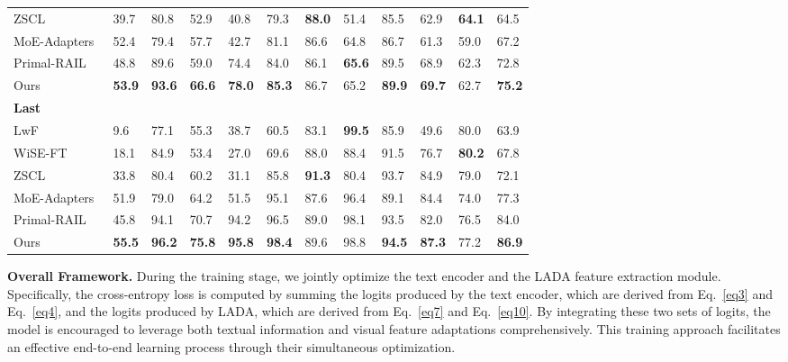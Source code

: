 \documentclass{article}
\theoremstyle{plain}
\theoremstyle{definition}
\theoremstyle{remark}
\begin{document}
\begin{table}[tbhp]
\begin{tabular}{b{15em}b{1.6em}b{1.6em}b{1.6em}b{1.6em}b{1.6em}b{1.6em}b{1.6em}b{1.6em}b{1.6em}b{1.6em}>{\centering\arraybackslash}m{3em}}
          \quad ZSCL~\cite{zheng2023preventing}  & 39.7 & 80.8 & 52.9 & 40.8 & 79.3 & \textbf{88.0} & 51.4 & 85.5 & 62.9 & \textbf{64.1} & {\cellcolor{lightgrey}}64.5\\
          \quad MoE-Adapters~\cite{yu2024boosting}  & 52.4 & 79.4 & 57.7 & 42.7 & 81.1 & 86.6 & 64.8 & 86.7 & 61.3 & 59.0 & {\cellcolor{lightgrey}}67.2\\
          \quad Primal-RAIL~\cite{xu2024advancing} & 48.8 & 89.6 & 59.0 & 74.4 & 84.0 & 86.1 & \textbf{65.6} & 89.5 & 68.9 & 62.3 & {\cellcolor{lightgrey}}72.8\\
          \quad Ours & \textbf{53.9} & \textbf{93.6} & \textbf{66.6} & \textbf{78.0} & \textbf{85.3} & 86.7 & 65.2 & \textbf{89.9} & \textbf{69.7} & 62.7 & {\cellcolor{lightgrey}}\textbf{75.2}\\
    \midrule
        \multicolumn{11}{l}{\textbf{Last}}\\
          \quad LwF~\cite{li2017learning}  & 9.6& 77.1 & 55.3 & 38.7 & 60.5 & 83.1 & \textbf{99.5} & 85.9 & 49.6 & 80.0 & {\cellcolor{lightgrey}}63.9\\
          \quad WiSE-FT~\cite{wortsman2022robust}  & 18.1& 84.9 & 53.4 & 27.0 & 69.6 & 88.0 & 88.4 & 91.5 & 76.7 & \textbf{80.2} & {\cellcolor{lightgrey}}67.8\\
          \quad ZSCL~\cite{zheng2023preventing}  & 33.8& 80.4 & 60.2 & 31.1 & 85.8 & \textbf{91.3} & 80.4 & 93.7 & 84.9 & 79.0 & {\cellcolor{lightgrey}}72.1\\
          \quad MoE-Adapters~\cite{yu2024boosting}  & 51.9 & 79.0 & 64.2 & 51.5 & 95.1 & 87.6 & 96.4 & 89.1 & 84.4 & 74.0 & {\cellcolor{lightgrey}}77.3\\
          \quad Primal-RAIL~\cite{xu2024advancing} & 45.8 & 94.1 & 70.7 & 94.2 & 96.5 & 89.0 & 98.1 & 93.5 & 82.0 & 76.5 & {\cellcolor{lightgrey}}84.0\\
          \quad Ours & \textbf{55.5} & \textbf{96.2} & \textbf{75.8} & \textbf{95.8} & \textbf{98.4} & 89.6 & 98.8 & \textbf{94.5} & \textbf{87.3} & 77.2 & {\cellcolor{lightgrey}}\textbf{86.9}\\
    \bottomrule
    \end{tabular}
\end{table}

\textbf{Overall Framework.}
During the training stage, we jointly optimize the text encoder and the LADA feature extraction module. Specifically, the cross-entropy loss is computed by summing the logits produced by the text encoder, which are derived from Eq.~\eqref{eq3} and Eq.~\eqref{eq4}, and the logits produced by LADA, which are derived from Eq.~\eqref{eq7} and Eq.~\eqref{eq10}. By integrating these two sets of logits, the model is encouraged to leverage both textual information and visual feature adaptations comprehensively. This training approach facilitates an effective end-to-end learning process through their simultaneous optimization.
\end{document}
